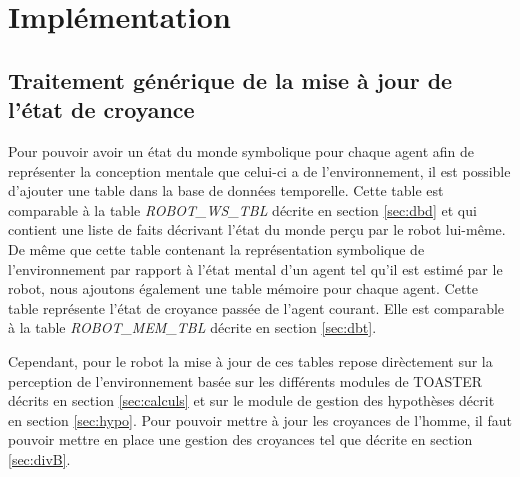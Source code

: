 \documentclass[a4paper,11pt,twoside]{StyleThese}
\begin{document}



\section{Implémentation}
\label{sec:dbPt}

\subsection{Traitement générique de la mise à jour de l'état de croyance}
Pour pouvoir avoir un état du monde symbolique pour chaque agent afin de représenter la conception mentale que celui-ci a de l'environnement, il est possible d'ajouter une table dans la base de données temporelle.
Cette table est comparable à la table \textit{ROBOT\_WS\_TBL} décrite en section \ref{sec:dbd} et qui contient une liste de faits décrivant l'état du monde perçu par le robot lui-même.
De même que cette table contenant la représentation symbolique de l'environnement par rapport à l'état mental d'un agent tel qu'il est estimé par le robot, nous ajoutons également une table mémoire pour chaque agent. Cette table représente l'état de croyance passée de l'agent courant. Elle est comparable à la table \textit{ROBOT\_MEM\_TBL} décrite en section \ref{sec:dbt}.

Cependant, pour le robot la mise à jour de ces tables repose dirèctement sur la perception de l'environnement basée sur les différents modules de TOASTER décrits en section \ref{sec:calculs} et sur le module de gestion des hypothèses décrit en section \ref{sec:hypo}. Pour pouvoir mettre à jour les croyances de l'homme, il faut pouvoir mettre en place une gestion des croyances tel que décrite en section \ref{sec:divB}.
\end{document}
